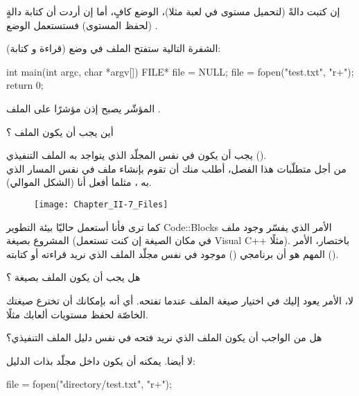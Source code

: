 إن كتبت دالةً
(لتحميل مستوى في لعبة مثلا)، الوضع
كافٍ، أما إن أردت أن كتابة دالةٍ
(لحفظ المستوى) فستستعمل الوضع
.

الشفرة التالية ستفتح الملف
في وضع
(قراءة و كتابة):

\begin{Csource}
int main(int argc, char *argv[])
{
	FILE* file = NULL;
	file = fopen("test.txt", "r+");
	return 0;
}
\end{Csource}

المؤشّر
يصبح إذن مؤشرًا على الملف
.

\begin{question}
  أين يجب أن يكون الملف
؟
\end{question}

يجب أن يكون في نفس المجلّد الذي يتواجد به الملف التنفيذي
().\\
من أجل متطلّبات هذا الفصل، أطلب منك أن تقوم بإنشاء ملف
في نفس المسار الذي به
،
مثلما أفعل أنا (الشكل الموالي).

\begin{figure}[H]
	\centering
	\texttt{[image: Chapter\_II-7\_Files]}
\end{figure}

كما ترى فأنا أستعمل  حاليّا بيئة التطوير
\textenglish{Code::Blocks}
الأمر الذي يفسّر وجود ملف المشروع بصيغة
(في مكان الصيغة
إن كنت تستعمل
\textenglish{Visual C++}
مثلًا). باختصار، الأمر المهم هو أن برنامجي
()
موجود في نفس مجلّد الملف الذي نريد قراءته أو كتابته
().

\begin{question}
  هل يجب أن يكون الملف بصيغة
؟
\end{question}

لا، الأمر يعود إليك في اختيار صيغة الملف عندما تفتحه. أي أنه بإمكانك أن تخترع صيغتك الخاصّة
لحفظ مستويات ألعابك مثلًا.

\begin{question}
  هل من الواجب أن يكون الملف الذي نريد فتحه في نفس دليل الملف التنفيذي؟
\end{question}

لا أيضا. يمكنه أن يكون داخل مجلّد بذات الدليل:

\begin{Csource}
file = fopen("directory/test.txt", "r+");
\end{Csource}

